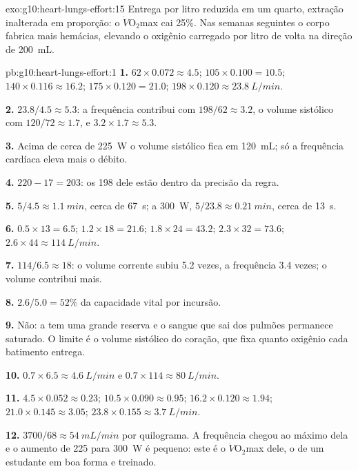 \begin{solution}{exo:g10:heart-lungs-effort:15}
Entrega por litro reduzida em um quarto, extração inalterada em
proporção: o $\dot V\!\mathrm{O_2}$max cai 25\%. Nas semanas seguintes
o corpo fabrica mais hemácias, elevando o oxigênio carregado por litro
de volta na direção de \qty{200}{mL}.
\end{solution}

\begin{solution}{pb:g10:heart-lungs-effort:1}
\textbf{1.} $62 \times 0.072 \approx 4.5$; $105 \times 0.100 = 10.5$;
$140 \times 0.116 \approx 16.2$; $175 \times 0.120 = 21.0$;
$198 \times 0.120 \approx \qty{23.8}{L/min}$.

\textbf{2.} $23.8/4.5 \approx 5.3$: a frequência contribui com $198/62
\approx 3.2$, o volume sistólico com $120/72 \approx 1.7$, e $3.2 \times
1.7 \approx 5.3$.

\textbf{3.} Acima de cerca de \qty{225}{W} o volume sistólico fica em
\qty{120}{mL}; só a frequência cardíaca eleva mais o débito.

\textbf{4.} $220 - 17 = 203$: os 198 dele estão dentro da precisão da regra.

\textbf{5.} $5/4.5 \approx \qty{1.1}{min}$, cerca de \qty{67}{s}; a
\qty{300}{W}, $5/23.8 \approx \qty{0.21}{min}$, cerca de \qty{13}{s}.

\textbf{6.} $0.5 \times 13 = 6.5$; $1.2 \times 18 = 21.6$; $1.8 \times
24 = 43.2$; $2.3 \times 32 = 73.6$; $2.6 \times 44 \approx
\qty{114}{L/min}$.

\textbf{7.} $114/6.5 \approx 18$: o volume corrente subiu 5.2 vezes, a
frequência 3.4 vezes; o volume contribui mais.

\textbf{8.} $2.6/5.0 = 52\%$ da capacidade vital por incursão.

\textbf{9.} Não: a  tem uma grande reserva e o sangue que sai
dos pulmões permanece saturado. O limite é o volume sistólico do
coração, que fixa quanto oxigênio cada batimento entrega.

\textbf{10.} $0.7 \times 6.5 \approx \qty{4.6}{L/min}$ e $0.7 \times
114 \approx \qty{80}{L/min}$.

\textbf{11.} $4.5 \times 0.052 \approx 0.23$; $10.5 \times 0.090
\approx 0.95$; $16.2 \times 0.120 \approx 1.94$; $21.0 \times 0.145
\approx 3.05$; $23.8 \times 0.155 \approx \qty{3.7}{L/min}$.

\textbf{12.} $3700/68 \approx \qty{54}{mL/min}$ por quilograma. A
frequência chegou ao máximo dela e o aumento de 225 para \qty{300}{W} é
pequeno: este é o $\dot V\!\mathrm{O_2}$max dele, o de um estudante em
boa forma e treinado.


\end{solution}
